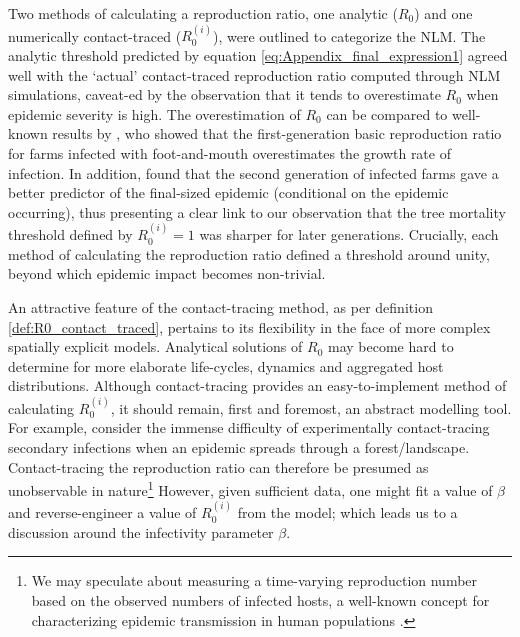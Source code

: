 Two methods of calculating a reproduction ratio, one analytic ($R_0$) and one numerically contact-traced ($R_0^{(i)}$), were outlined to categorize the NLM.
The analytic threshold predicted by equation \ref{eq:Appendix_final_expression1} agreed well with the `actual' contact-traced reproduction ratio computed through NLM simulations,
caveat-ed by the observation that it tends to overestimate $R_0$ when epidemic severity is high.
The overestimation of $R_0$ can be compared to well-known results by \cite{R0-perc-ref, doi:10.1098/rsif.2005.0051},
who showed that the first-generation basic reproduction ratio for farms infected with foot-and-mouth overestimates the growth rate of infection.
In addition, \cite{R0-perc-ref} found that the second generation of infected farms gave a better predictor of the final-sized epidemic (conditional on the epidemic occurring),
thus presenting a clear link to our observation that the tree mortality threshold defined by $R_0^{(i)}=1$ was sharper for later generations.
Crucially, each method of calculating the reproduction ratio defined a threshold around unity, beyond which epidemic impact becomes non-trivial.

An attractive feature of the contact-tracing method, as per definition \ref{def:R0_contact_traced}, 
pertains to its flexibility in the face of more complex spatially explicit models.
Analytical solutions of $R_0$ may become hard to determine for more elaborate life-cycles, dynamics and aggregated host distributions.
Although contact-tracing provides an easy-to-implement method of calculating $R_0^{(i)}$, it should remain, first and foremost, an abstract modelling tool.
For example, consider the immense difficulty of experimentally contact-tracing secondary infections when an epidemic spreads through a forest/landscape.
Contact-tracing the reproduction ratio can therefore be presumed as unobservable in nature\footnote{
We may speculate about measuring a time-varying reproduction number based on the observed numbers of infected hosts,
a well-known concept for characterizing epidemic transmission in human populations \cite{thompson2019improved}.}
However, given sufficient data, one might fit a value of $\beta$ and reverse-engineer a value of $R_0^{(i)}$ from the model;
which leads us to a discussion around the infectivity parameter $\beta$.

